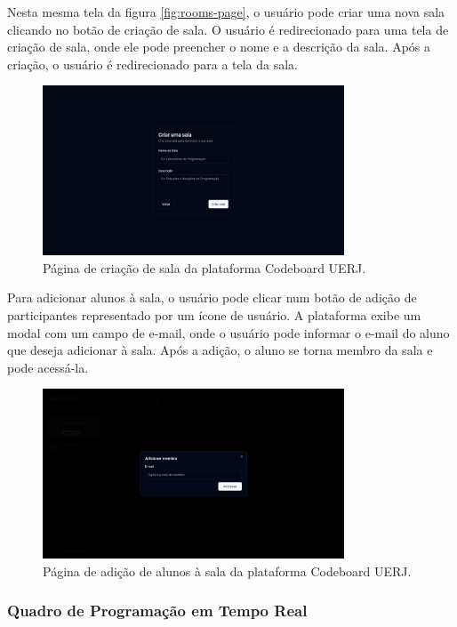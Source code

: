 Nesta mesma tela da figura \ref{fig:rooms-page}, o usuário pode criar uma nova sala clicando no botão de criação de sala. O usuário é redirecionado para uma tela de criação de sala, onde ele pode preencher o nome e a descrição da sala. Após a criação, o usuário é redirecionado para a tela da sala.

\begin{figure}[H]
    \centering
    \includegraphics[width=0.8\textwidth]{assets/codeboard/create-room-page.png}
    \caption{Página de criação de sala da plataforma Codeboard UERJ.}
    \label{fig:create-room-page}
\end{figure}

Para adicionar alunos à sala, o usuário pode clicar num botão de adição de participantes representado por um ícone de usuário. A plataforma exibe um modal com um campo de e-mail, onde o usuário pode informar o e-mail do aluno que deseja adicionar à sala. Após a adição, o aluno se torna membro da sala e pode acessá-la.

\begin{figure}[H]
    \centering
    \includegraphics[width=0.8\textwidth]{assets/codeboard/add-member-modal.png}
    \caption{Página de adição de alunos à sala da plataforma Codeboard UERJ.}
    \label{fig:add-member-modal}
\end{figure}

\subsubsection{Quadro de Programação em Tempo Real}

